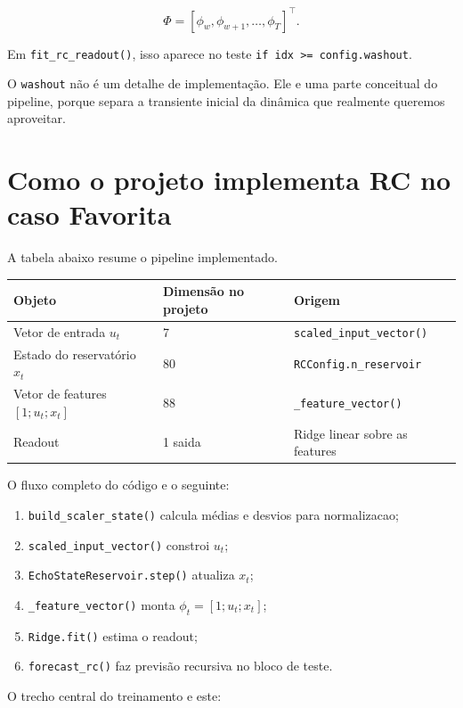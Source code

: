 \documentclass[12pt]{article}
\providecommand{\tightlist}{%
              \setlength{\itemsep}{0pt}\setlength{\parskip}{0pt}}
\begin{document}
\[
\Phi = [\phi_w, \phi_{w+1}, \dots, \phi_T]^\top.
\]

Em \texttt{fit\_rc\_readout()}, isso aparece no teste \texttt{if\ idx\ \textgreater{}=\ config.washout}.

O \texttt{washout} não é um detalhe de implementação. Ele e uma parte conceitual do pipeline, porque separa a transiente inicial da dinâmica que realmente queremos aproveitar.

\section{Como o projeto implementa RC no caso Favorita}\label{7-como-o-projeto-implementa-rc-no-caso-favorita}

A tabela abaixo resume o pipeline implementado.

\begin{longtable}[]{@{}lll@{}}
\toprule\noalign{}
Objeto & Dimensão no projeto & Origem \\
\midrule\noalign{}
\endhead
\bottomrule\noalign{}
\endlastfoot
Vetor de entrada \(u_t\) & 7 & \texttt{scaled\_input\_vector()} \\
Estado do reservatório \(x_t\) & 80 & \texttt{RCConfig.n\_reservoir} \\
Vetor de features \([1; u_t; x_t]\) & 88 & \texttt{\_feature\_vector()} \\
Readout & 1 saida & Ridge linear sobre as features \\
\end{longtable}

O fluxo completo do código e o seguinte:

\begin{enumerate}
\def\labelenumi{\arabic{enumi}.}
\tightlist
\item
  \texttt{build\_scaler\_state()} calcula médias e desvios para normalizacao;
\item
  \texttt{scaled\_input\_vector()} constroi \(u_t\);
\item
  \texttt{EchoStateReservoir.step()} atualiza \(x_t\);
\item
  \texttt{\_feature\_vector()} monta \(\phi_t = [1; u_t; x_t]\);
\item
  \texttt{Ridge.fit()} estima o readout;
\item
  \texttt{forecast\_rc()} faz previsão recursiva no bloco de teste.
\end{enumerate}

O trecho central do treinamento e este:
\end{document}
